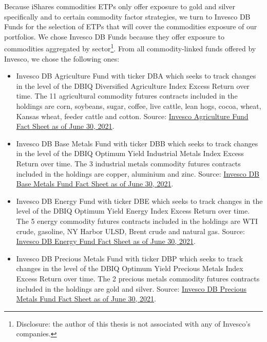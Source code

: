 Because iShares commodities ETPs only offer exposure to gold and silver specifically and to certain commodity factor strategies, we turn to Invesco DB Funds for the selection of ETPs that will cover the commodities exposure of our portfolios. We chose Invesco DB Funds because they offer exposure to commodities aggregated by sector\footnote{Disclosure: the author of this thesis is not associated with any of Invesco's companies.}. From all commodity-linked funds offered by Invesco, we chose the following ones:
\begin{itemize}
    \item Invesco DB Agriculture Fund with ticker DBA which seeks to track changes in the level of the DBIQ Diversified Agriculture Index Excess Return over time. The 11 agricultural commodity futures contracts included in the holdings are corn, soybeans, sugar, coffee, live cattle, lean hogs, cocoa, wheat, Kansas wheat, feeder cattle and cotton. Source: \href{https://www.invesco.com/us-rest/contentdetail?contentId=f919e01e98630410VgnVCM10000046f1bf0aRCRD&dnsName=us}{Invesco Agriculture Fund Fact Sheet as of June 30, 2021}.%
    
    \item Invesco DB Base Metals Fund with ticker DBB which seeks to track changes in the level of the DBIQ Optimum Yield Industrial Metals Index Excess Return over time. The 3 industrial metals commodity futures contracts included in the holdings are copper, aluminium and zinc. Source: \href{https://www.invesco.com/us-rest/contentdetail?contentId=3919e01e98630410VgnVCM10000046f1bf0aRCRD&dnsName=us}{Invesco DB Base Metals Fund Fact Sheet as of June 30, 2021}.%
    
    \item Invesco DB Energy Fund with ticker DBE which seeks to track changes in the level of the DBIQ Optimum Yield Energy Index Excess Return over time. The 5 energy commodity futures contracts included in the holdings are WTI crude, gasoline, NY Harbor ULSD, Brent crude and natural gas. Source: \href{https://www.invesco.com/us-rest/contentdetail?contentId=7519e01e98630410VgnVCM10000046f1bf0aRCRD&dnsName=us}{Invesco DB Energy Fund Fact Sheet as of June 30, 2021}.%
    
    \item Invesco DB Precious Metals Fund with ticker DBP which seeks to track changes in the level of the DBIQ Optimum Yield Precious Metals Index Excess Return over time. The 2 precious metals commodity futures contracts included in the holdings are gold and silver. Source: \href{https://www.invesco.com/us-rest/contentdetail?contentId=f619e01e98630410VgnVCM10000046f1bf0aRCRD&dnsName=us}{Invesco DB Precious Metals Fund Fact Sheet as of June 30, 2021}.%
\end{itemize}

